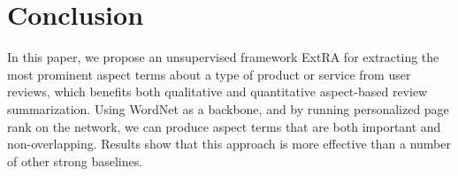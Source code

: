 \section{Conclusion}

In this paper, we propose an unsupervised framework ExtRA for 
extracting the most prominent aspect terms about a type of product 
or service from user reviews, which benefits both qualitative and 
quantitative aspect-based review summarization.
Using WordNet as a backbone, and by running personalized page rank
on the network, we can produce aspect terms that are both important
and non-overlapping. Results show that this approach is more
effective than a number of other strong baselines.

